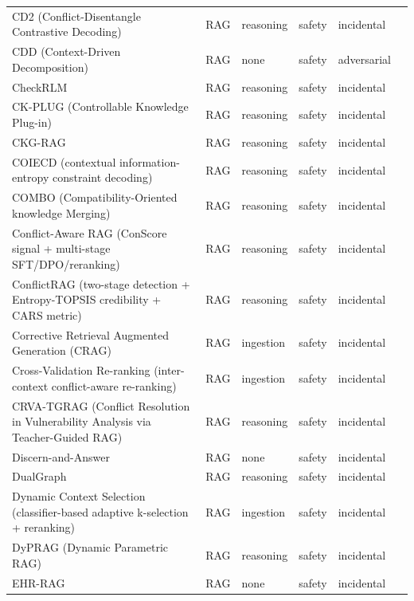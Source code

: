 \begin{longtable}{@{}>{\raggedright\arraybackslash}p{}lllll@{}}
CD2 (Conflict-Disentangle Contrastive Decoding) & RAG & reasoning & safety & incidental & \cite{jin-2024-tugofwar} \\
CDD (Context-Driven Decomposition) & RAG & none & safety & adversarial & \cite{chen-2026-rag} \\
CheckRLM & RAG & reasoning & safety & incidental & \cite{xu-2026-checkrlm} \\
CK-PLUG (Controllable Knowledge Plug-in) & RAG & reasoning & safety & incidental & \cite{bi-2025-parameters} \\
CKG-RAG & RAG & reasoning & safety & incidental & \cite{zhang-2026-ckgrag} \\
COIECD (contextual information-entropy constraint decoding) & RAG & reasoning & safety & incidental & \cite{yuan-2024-discerning} \\
COMBO (Compatibility-Oriented knowledge Merging) & RAG & reasoning & safety & incidental & \cite{zhang-2023-merging} \\
Conflict-Aware RAG (ConScore signal + multi-stage SFT/DPO/reranking) & RAG & reasoning & safety & incidental & \cite{wu-2026-conflictaware} \\
ConflictRAG (two-stage detection + Entropy-TOPSIS credibility + CARS metric) & RAG & reasoning & safety & incidental & \cite{wang-2026-conflictrag} \\
Corrective Retrieval Augmented Generation (CRAG) & RAG & ingestion & safety & incidental & \cite{yan-2024-corrective} \\
Cross-Validation Re-ranking (inter-context conflict-aware re-ranking) & RAG & ingestion & safety & incidental & \cite{wu-2025-eliminating} \\
CRVA-TGRAG (Conflict Resolution in Vulnerability Analysis via Teacher-Guided RAG) & RAG & reasoning & safety & incidental & \cite{zhou-2026-tugofwar} \\
Discern-and-Answer & RAG & none & safety & incidental & \cite{hong-2023-gullible} \\
DualGraph & RAG & reasoning & safety & incidental & \cite{shi-2026-tale} \\
Dynamic Context Selection (classifier-based adaptive k-selection + reranking) & RAG & ingestion & safety & incidental & \cite{iratni-2025-dynamic} \\
DyPRAG (Dynamic Parametric RAG) & RAG & reasoning & safety & incidental & \cite{tan-2025-dynamic} \\
EHR-RAG & RAG & none & safety & incidental & \cite{cao-2026-ehrrag} \\

\end{longtable}
